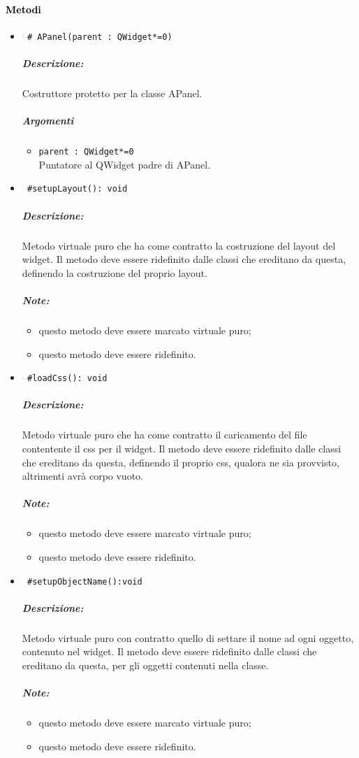 \paragraph{\textcolor{black}{Metodi\\}}
\begin{itemize}
\item \color{blue}\verb! # APanel(parent : QWidget*=0)!
\color{black}
\subparagraph{Descrizione: }Costruttore protetto per la classe APanel.
\subparagraph{Argomenti}
\begin{itemize}
\item \color{RoyalPurple} \verb!parent : QWidget*=0! \\ Puntatore al QWidget padre di APanel.
\end{itemize}

\item \color{blue}\verb! #setupLayout(): void !
\color{black}
\subparagraph{Descrizione:} Metodo virtuale puro che ha come contratto la costruzione del layout del widget. Il metodo deve essere ridefinito dalle classi che ereditano da questa, definendo la costruzione del proprio layout.
\subparagraph{Note:}
\begin{itemize}
\item questo metodo deve essere marcato virtuale puro;
\item questo metodo deve essere ridefinito.
\end{itemize}

\item \color{blue}\verb! #loadCss(): void !
\color{black} 
\subparagraph{Descrizione:} Metodo virtuale puro che ha come contratto il caricamento del file contentente il css per il widget. Il metodo deve essere ridefinito dalle classi che ereditano da questa, definendo il proprio css, qualora ne sia provvisto, altrimenti avrà corpo vuoto. \\ 
 \subparagraph{Note:}
 \begin{itemize}
 \item questo metodo deve essere marcato virtuale puro;
 \item questo metodo deve essere ridefinito.
 \end{itemize}

\item \color{blue}\verb! #setupObjectName():void!
\color{black}
\subparagraph{Descrizione:} Metodo virtuale puro con contratto quello di settare il nome ad ogni oggetto, contenuto nel widget. Il metodo deve essere ridefinito dalle classi che ereditano da questa, per gli oggetti contenuti nella classe. \\
 \subparagraph{Note:}
 \begin{itemize}
 \item questo metodo deve essere marcato virtuale puro;
 \item questo metodo deve essere ridefinito.
 \end{itemize}
  

\end{itemize}
